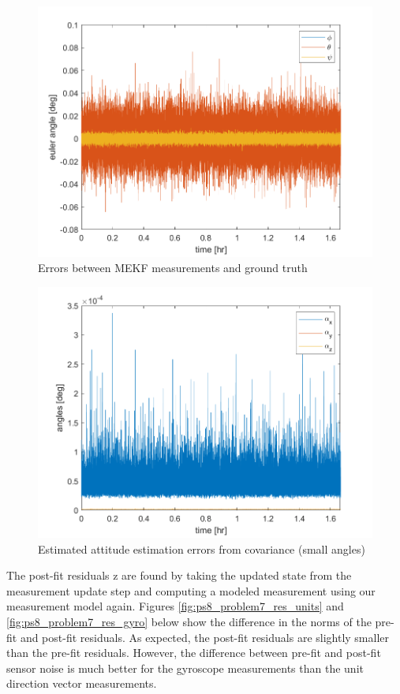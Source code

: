 \begin{figure}[H]
\centering
\includegraphics[scale=0.8]{Images/ps8_problem7_error.png}
\caption{Errors between MEKF measurements and ground truth}
\label{fig:ps8_problem7_error}
\end{figure}

\begin{figure}[H]
\centering
\includegraphics[scale=0.8]{Images/ps8_problem7_cov.png}
\caption{Estimated attitude estimation errors from covariance (small angles)}
\label{fig:ps8_problem7_cov}
\end{figure}

The post-fit residuals z are found by taking the updated state from the measurement update step and computing a modeled measurement using our measurement model again. Figures \ref{fig:ps8_problem7_res_units} and \ref{fig:ps8_problem7_res_gyro} below show the difference in the norms of the pre-fit and post-fit residuals. As expected, the post-fit residuals are slightly smaller than the pre-fit residuals. However, the difference between pre-fit and post-fit sensor noise is much better for the gyroscope measurements than the unit direction vector measurements.

